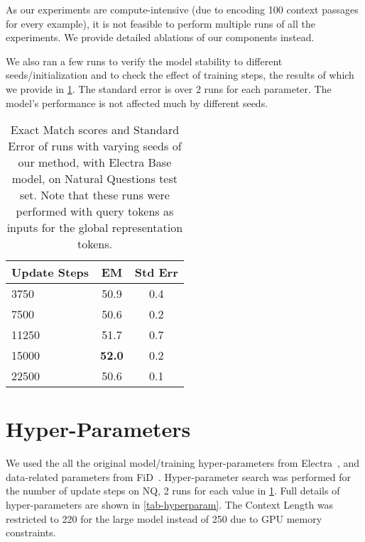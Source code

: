 \documentclass[11pt]{article}
\begin{document}
As our experiments are compute-intensive (due to encoding 100 context passages for every example), it is not feasible to perform multiple runs of all the experiments. We provide detailed ablations of our components instead. 

We also ran a few runs to verify the model stability to different seeds/initialization and to check the effect of training steps, the results of which we provide in \cref{tab_sup_std}. The standard error is over 2 runs for each parameter. The model's performance is not affected much by different seeds.

\begin{table}[h!]
\begin{center}
\begin{tabular}{lcc}
\toprule
\textbf{Update Steps} & \textbf{EM} & \textbf{Std Err} \\ 
\toprule
3750 & 50.9 & 0.4 \\
7500 & 50.6 & 0.2 \\
11250 & 51.7 & 0.7 \\
15000 & \textbf{52.0} & 0.2 \\
22500 & 50.6 & 0.1 \\
\bottomrule
\end{tabular}
\end{center}
\caption{Exact Match scores and Standard Error of runs with varying seeds of our method, with Electra Base model, on Natural Questions test set. Note that these runs were performed with query tokens as inputs for the global representation tokens.}
\label{tab_sup_std}
\end{table}



\section{Hyper-Parameters}

We used the all the original model/training hyper-parameters from Electra~\cite{clark2020electra}, and data-related parameters from FiD~\cite{fid}. Hyper-parameter search was performed for the number of update steps on NQ, 2 runs for each value in \cref{tab_sup_std}. Full details of hyper-parameters are shown in \cref{tab-hyperparam}. The Context Length was restricted to 220 for the large model instead of 250 due to GPU memory constraints.
\end{document}
